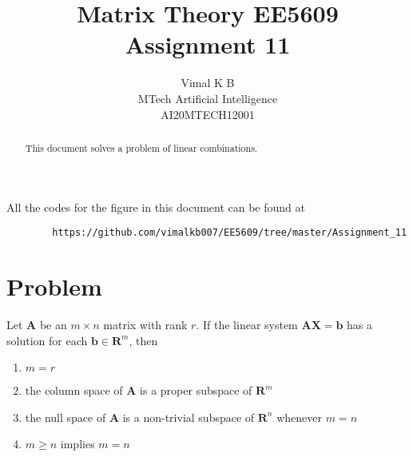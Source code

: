 \documentclass[journal,12pt,twocolumn]{IEEEtran}
\begin{document}
	\makeatletter
	\makeatother
	\let\StandardTheFigure\thefigure
	\let\vec\mathbf
	\renewcommand{\thefigure}{\theproblem}
	\def\putbox#1#2#3{\makebox[0in][l]{\makebox[#1][l]{}\raisebox{\baselineskip}[0in][0in]{\raisebox{#2}[0in][0in]{#3}}}}
	\def\rightbox#1{\makebox[0in][r]{#1}}
	\def\centbox#1{\makebox[0in]{#1}}
	\def\topbox#1{\raisebox{-\baselineskip}[0in][0in]{#1}}
	\def\midbox#1{\raisebox{-0.5\baselineskip}[0in][0in]{#1}}
	\vspace{3cm}
	\title{Matrix Theory EE5609\\  Assignment 11}
	\author{Vimal K B\\MTech Artificial Intelligence\\AI20MTECH12001}
	\maketitle
	\newpage
	\bigskip
	\renewcommand{\thefigure}{\theenumi}
	\renewcommand{\thetable}{\theenumi}
	\begin{abstract}
		This document solves a problem of linear combinations. 
	\end{abstract}
	All the codes for the figure in this document can be found at
	\begin{lstlisting}
		https://github.com/vimalkb007/EE5609/tree/master/Assignment_11
	\end{lstlisting}
	\section{\textbf{Problem}}
	Let $\vec{A}$ be an $m\times n$ matrix with rank $r$. If the linear system $\vec{A}\vec{X} = \vec{b}$ has a solution for each $\vec{b} \in \mathbf{R}^{m}$, then
	\begin{enumerate}
		\item $m=r$
		\item the column space of $\vec{A}$ is a proper subspace of $\mathbf{R}^{m}$ 
		\item the null space of $\vec{A}$ is a non-trivial subspace of $\mathbf{R}^{n}$ whenever $m=n$
		\item $m\geq n$ implies $m=n$
	\end{enumerate}
	
\end{document}
